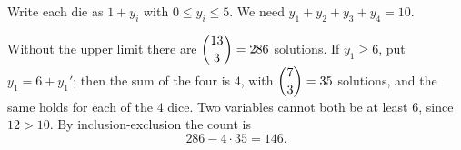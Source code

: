 Write each die as $1+y_i$ with $0\le y_i\le5$. We need $y_1+y_2+y_3+y_4=10$.

Without the upper limit there are $\dbinom{13}{3}=286$ solutions. If $y_1\ge6$, put $y_1=6+y_1'$; then the sum of the four is $4$, with $\dbinom73=35$ solutions, and the same holds for each of the $4$ dice. Two variables cannot both be at least $6$, since $12>10$. By inclusion-exclusion the count is
\[
286-4\cdot35=\boxed{146}.
\]
